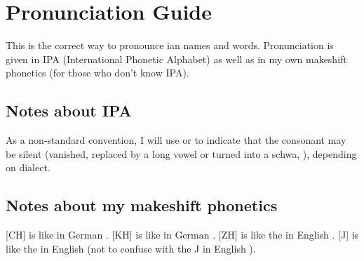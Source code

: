 \chapter{Pronunciation Guide}
\label{PronunIPA}




\indent 
This is the correct way to pronounce \Miith{}ian names and words. Pronunciation is given in IPA (International Phonetic Alphabet) as well as in my own makeshift phonetics (for those who don't know IPA). 









\section{Notes about IPA}
As a non-standard convention, I will use \txipa{[(\rr)]} or \txipa{[(\gr)]} to indicate that the consonant may be silent (vanished, replaced by a long vowel or turned into a schwa, \txipa{[@]}), depending on dialect. 









\section{Notes about my makeshift phonetics}
[CH] is like in German . [KH] is like in German . [ZH] is like the  in English . [J] is like the  in English  (not to confuse with the  J in English ). 

